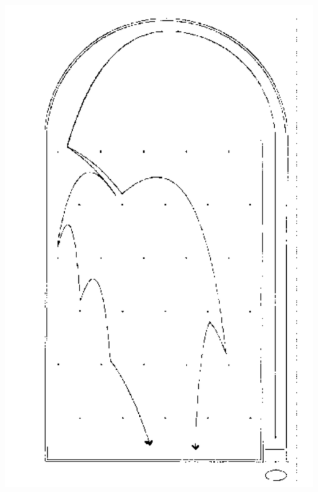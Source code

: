 \documentclass[aspectratio=169]{beamer}
\begin{document}
\begin{frame}
\frametitle{}

\begin{center}
\includegraphics[height = 0.9\textheight]{figures/lorenz_essence_1993_fig1}
\end{center}

\end{frame}
\end{document}
